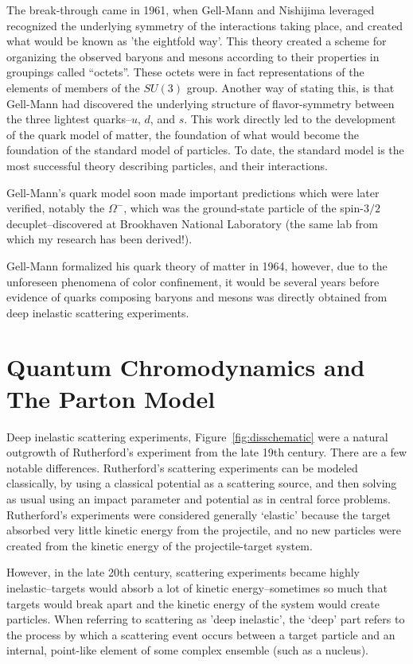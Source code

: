 The break-through came in 1961, when Gell-Mann and Nishijima leveraged
recognized the underlying symmetry of the interactions taking place, and created
what would be known as 'the eightfold way'. This theory created a scheme for
organizing the observed baryons and mesons according to their properties in
groupings called ``octets''. These octets were in fact representations of the
elements of members of the $SU(3)$ group. Another way of stating this, is that
Gell-Mann had discovered the underlying structure of flavor-symmetry between the
three lightest quarks--$u$, $d$, and $s$. This work directly led to the
development of the quark model of matter, the foundation of what would become
the foundation of the standard model of particles. To date, the standard model
is the most successful theory describing particles, and their interactions.

Gell-Mann's quark model soon made important predictions which were later
verified, notably the $\Omega^{-}$, which was the ground-state particle of the
spin-$3/2$ decuplet--discovered at Brookhaven National Laboratory (the same lab
from which my research has been derived!). 

Gell-Mann formalized his quark theory of matter in 1964, however, due to the
unforeseen phenomena of color confinement, it would be several years before
evidence of quarks composing baryons and mesons was directly obtained from deep
inelastic scattering experiments.

\clearpage
\section{Quantum Chromodynamics and The Parton Model}

Deep inelastic scattering experiments, Figure~\ref{fig:disschematic} were a
natural outgrowth of Rutherford's experiment from the late 19th century. There
are a few notable differences.  Rutherford's scattering experiments can be
modeled classically, by using a classical potential as a scattering source, and
then solving as usual using an impact parameter and potential as in central
force problems. Rutherford's experiments were considered generally `elastic'
because the target absorbed very little kinetic energy from the projectile, and
no new particles were created from the kinetic energy of the projectile-target
system.

However, in the late 20th century, scattering experiments became highly
inelastic--targets would absorb a lot of kinetic energy--sometimes so much
that targets would break apart and the kinetic energy of the system would create
particles. When referring to scattering as 'deep inelastic', the `deep' part
refers to the process by which a scattering event occurs between a target
particle and an internal, point-like element of some complex ensemble (such as a
nucleus).

